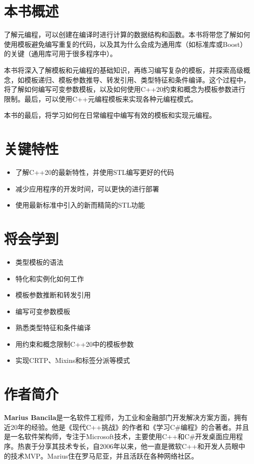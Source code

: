 \section*{本书概述}

了解元编程，可以创建在编译时进行计算的数据结构和函数。本书将带您了解如何使用模板避免编写重复的代码，以及其为什么会成为通用库（如标准库或Boost）的关键（通用库可用于很多程序中）。

本书将深入了解模板和元编程的基础知识，再练习编写复杂的模板，并探索高级概念，如模板递归、模板参数推导、转发引用、类型特征和条件编译。这个过程中，将了解如何编写可变参数模板，以及如何使用C++20约束和概念为模板参数进行限制。最后，可以使用C++元编程模板来实现各种元编程模式。

本书的最后，将学习如何在日常编程中编写有效的模板和实现元编程。

\section*{关键特性}
\begin{itemize}
  \item 了解C++20的最新特性，并使用STL编写更好的代码
  \item 减少应用程序的开发时间，可以更快的进行部署
  \item 使用最新标准中引入的新而精简的STL功能
\end{itemize}

\section*{将会学到}
\begin{itemize}
  \item 类型模板的语法
  \item 特化和实例化如何工作
  \item 模板参数推断和转发引用
  \item 编写可变参数模板
  \item 熟悉类型特征和条件编译
  \item 用约束和概念限制C++20中的模板参数
  \item 实现CRTP、Mixins和标签分派等模式
\end{itemize}

\section*{作者简介}

\textbf{Marius Bancila}是一名软件工程师，为工业和金融部门开发解决方案方面，拥有近20年的经验。他是《现代C++挑战》的作者和《学习C\#编程》的合著者。并且是一名软件架构师，专注于Microsoft技术，主要使用C++和C\#开发桌面应用程序。热衷于分享其技术专长，自2006年以来，他一直是微软C++和开发人员眼中的技术MVP。Marius住在罗马尼亚，并且活跃在各种网络社区。


